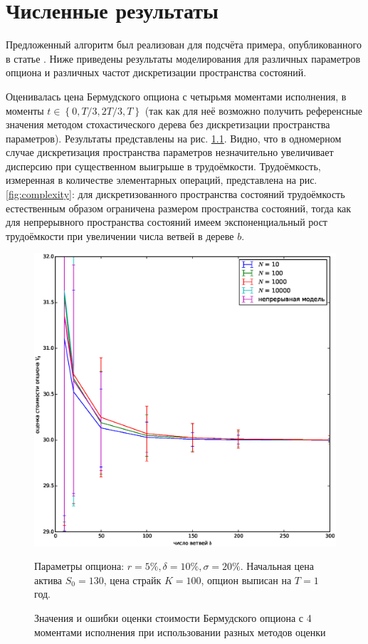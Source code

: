 \documentclass[specialist,
               substylefile = ../spbu.rtx,
               subf,href,colorlinks=true, 12pt]{disser}
\begin{document}
\chapter{Численные результаты}
    Предложенный алгоритм был реализован для подсчёта примера, опубликованного в статье \cite{Broadie1997}. Ниже приведены результаты моделирования для различных параметров опциона и различных частот дискретизации пространства состояний.
    
    Оценивалась цена Бермудского опциона с четырьмя моментами исполнения, в моменты $t \in \left\lbrace 0, T/3, 2T/3, T\right\rbrace$ (так как для неё возможно получить референсные значения методом стохастического дерева без дискретизации пространства параметров). Результаты представлены на рис. \ref{fig:value}. Видно, что в одномерном случае дискретизация пространства параметров незначительно увеличивает дисперсию при существенном выигрыше в трудоёмкости. Трудоёмкость, измеренная в количестве элементарных операций, представлена на рис. \ref{fig:complexity}: для дискретизованного пространства состояний трудоёмкость естественным образом ограничена размером пространства состояний, тогда как для непрерывного пространства состояний имеем экспоненциальный рост трудоёмкости при увеличении числа ветвей в дереве $b$.
    \begin{figure}[h]
    		\includegraphics[width=\textwidth]{130}
    		\caption{Значения и ошибки оценки стоимости Бермудского опциона с 4 моментами исполнения при использовании разных методов оценки}
    		Параметры опциона: $r = 5\%, \delta = 10\%, \sigma = 20\%$. Начальная цена актива $S_0 = 130$, цена страйк $K = 100$, опцион выписан на $T=1$ год.
    		\label{fig:value}
	\end{figure}
\end{document}
